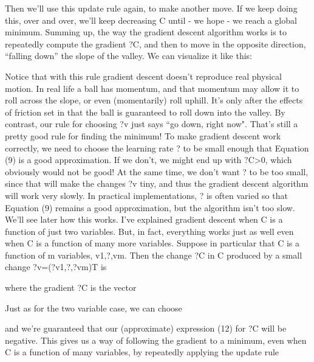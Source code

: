 Then we'll use this update rule again, to make another move. If we keep doing this, over and over, we'll keep decreasing C until - we hope - we reach a global minimum.
Summing up, the way the gradient descent algorithm works is to repeatedly compute the gradient ?C, and then to move in the opposite direction, ``falling down'' the slope of the valley. We can visualize it like this:

Notice that with this rule gradient descent doesn't reproduce real physical motion. In real life a ball has momentum, and that momentum may allow it to roll across the slope, or even (momentarily) roll uphill. It's only after the effects of friction set in that the ball is guaranteed to roll down into the valley. By contrast, our rule for choosing ?v just says ``go down, right now". That's still a pretty good rule for finding the minimum!
To make gradient descent work correctly, we need to choose the learning rate ? to be small enough that Equation (9) is a good approximation. If we don't, we might end up with ?C>0, which obviously would not be good! At the same time, we don't want ? to be too small, since that will make the changes ?v tiny, and thus the gradient descent algorithm will work very slowly. In practical implementations, ? is often varied so that Equation (9) remains a good approximation, but the algorithm isn't too slow. We'll see later how this works. 
I've explained gradient descent when C is a function of just two variables. But, in fact, everything works just as well even when C is a function of many more variables. Suppose in particular that C is a function of m variables, v1,?,vm. Then the change ?C in C produced by a small change ?v=(?v1,?,?vm)T is 

where the gradient ?C is the vector 

Just as for the two variable case, we can choose 

and we're guaranteed that our (approximate) expression (12) for ?C will be negative. This gives us a way of following the gradient to a minimum, even when C is a function of many variables, by repeatedly applying the update rule 


